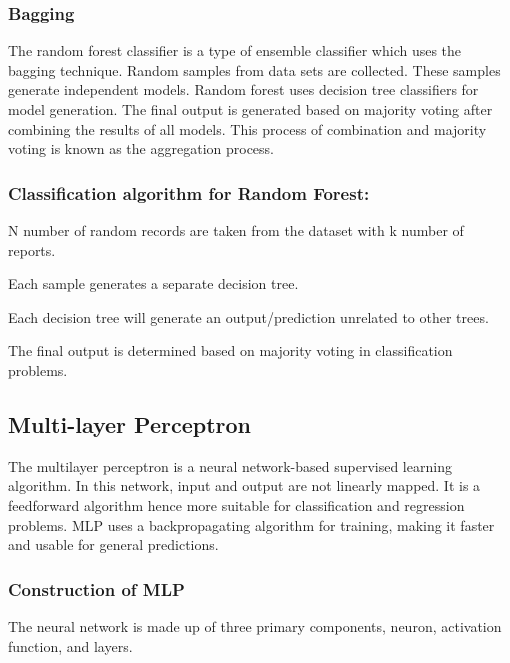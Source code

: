 \subsubsection{Bagging}
\vspace{-0.5em}
The random forest classifier is a type of ensemble classifier which uses the bagging technique. Random samples from data sets are collected. These samples generate independent models. Random forest uses decision tree classifiers for model generation. The final output is generated based on majority voting after combining the results of all models. This process of combination and majority voting is known as the aggregation process.

\subsubsection{Classification algorithm for Random Forest:}
\begin{steps}
  \vspace{-0.5em}
  \setlength{\itemsep}{-0.2em}
  \item N number of random records are taken from the dataset with k number of reports.
  \item Each sample generates a separate decision tree.
  \item Each decision tree will generate an output/prediction unrelated to other trees.
  \item The final output is determined based on majority voting in classification problems.
  \vspace{-1em}
\end{steps}

\subsection{Multi-layer Perceptron} \label{subsec:multi_layer_perceptron}
The multilayer perceptron is a neural network-based supervised learning algorithm. In this network, input and output are not linearly mapped. It is a feedforward algorithm hence more suitable for classification and regression problems. MLP uses a backpropagating algorithm for training, making it faster and usable for general predictions.

\subsubsection{Construction of MLP}
\vspace{-0.5em}
The neural network is made up of three primary components, neuron, activation function, and layers.

